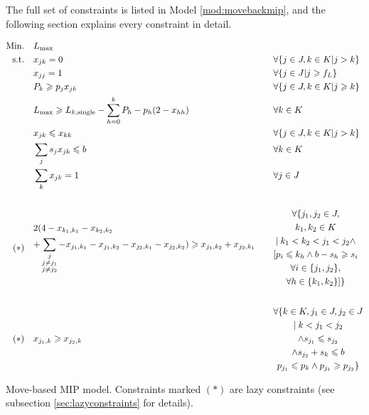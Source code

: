 \documentclass[13pt, letterpaper, oneside]{book}
\begin{document}
The full set of constraints is listed in Model \ref{mod:movebackmip}, and the
following section explains every constraint in detail.
\begin{model}
\begin{alignat}{2}
\text{Min.}\quad & \Lmax && \\
\label{mbm:eq1}\text{s.t.}\quad & x_{jk} = 0 \quad && \forall \{j \in J, k \in K | j > k\} \\
&\label{mbm:eq2} x_{jj} = 1 \quad && \forall \{j \in J | j \geq f_L\} \\
&\label{mbm:eq3} P_k \geq p_j x_{jk} \quad && \forall \{j \in J, k \in K | j \geq k\} \\
&\label{mbm:eq4} \Lmax \geq L_{k,\text{single}} - \sum_{h=0}^{k} P_h - p_h(2 - x_{hh}) \quad && \forall k \in K \\
&\label{mbm:eq5} x_{jk} \leq x_{kk} \quad && \forall \{j \in J, k \in K | j > k\} \\
& \sum_{j} s_j x_{jk} \leq b \quad && \forall k \in K \\
& \sum_{k} x_{jk} = 1 \quad && \forall j \in J \\[4ex]
(*)\quad & \begin{gathered} 2(  4 - x_{k_1,k_1} - x_{k_2,k_2} \hfill \\+ \sum_{\substack{{j}\\{j \neq j_1}\\{j \neq
j_2}}} - x_{j_1,k_1} - x_{j_1,k_2} -
x_{j_2,k_1} - x_{j_2,k_2} ) \geq x_{j_1,k_2} + x_{j_2,k_1} \end{gathered}
\quad && \begin{gathered} \forall\{ j_1, j_2 \in J, \\ k_1, k_2 \in K \\|\; k_1 < k_2 <
j_1 < j_2 \land \\ [p_i \leq k_h \land b - s_h \geq s_i\\ \forall i \in
\{j_1,j_2\}, \\ \forall h
\in \{k_1,k_2\}] \} \end{gathered} \\[4ex]
(*)\quad & x_{j_1,k} \geq x_{j_2,k} \quad && \begin{gathered} \forall \{k \in K,
j_1 \in J, j_2 \in J \\|\; k < j_1 < j_2 \\ \land s_{j_1} \leq s_{j_2} \\
\land s_{j_2} + s_k \leq b \\ p_{j_1} \leq p_k 
\land p_{j_1} \geq p_{j_2} \} \\
\end{gathered}
\end{alignat}
\caption{Move-based MIP model. Constraints marked $(*)$ are lazy constraints
(see subsection \ref{sec:lazyconstraints} for details).}
\label{mod:movebackmip}
\end{model}
\end{document}
